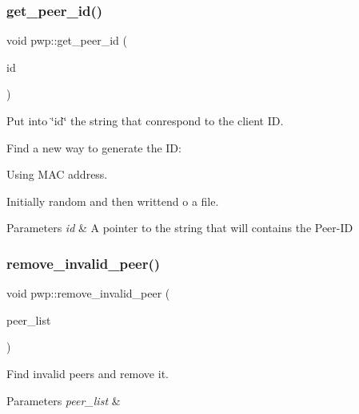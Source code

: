 \subsubsection{\texorpdfstring{get\+\_\+peer\+\_\+id()}{get\_peer\_id()}}
{\footnotesize\ttfamily void pwp\+::get\+\_\+peer\+\_\+id (\begin{DoxyParamCaption}\item[{string $\ast$}]{id }\end{DoxyParamCaption})}



Put into \char`\"{}id\char`\"{} the string that conrespond to the client ID. 

Find a new way to generate the ID\+:
\begin{DoxyEnumerate}
\item Using M\+AC address.
\item Initially random and then writtend o a file.
\end{DoxyEnumerate}


\begin{DoxyParams}{Parameters}
{\em id} & A pointer to the string that will contains the Peer-\/\+ID \\
\hline
\end{DoxyParams}
\mbox{\label{namespacepwp_ae8331eb5e3c98deddc6022dad92352f6}} 
\subsubsection{\texorpdfstring{remove\+\_\+invalid\+\_\+peer()}{remove\_invalid\_peer()}}
{\footnotesize\ttfamily void pwp\+::remove\+\_\+invalid\+\_\+peer (\begin{DoxyParamCaption}\item[{pwp\+::\+Peer\+List}]{peer\+\_\+list }\end{DoxyParamCaption})}



Find invalid peers and remove it. 


\begin{DoxyParams}{Parameters}
{\em peer\+\_\+list} & \\
\hline
\end{DoxyParams}
\mbox{\label{namespacepwp_a851ddc0e8fb2eb0a86317cc944c4a927}} 
